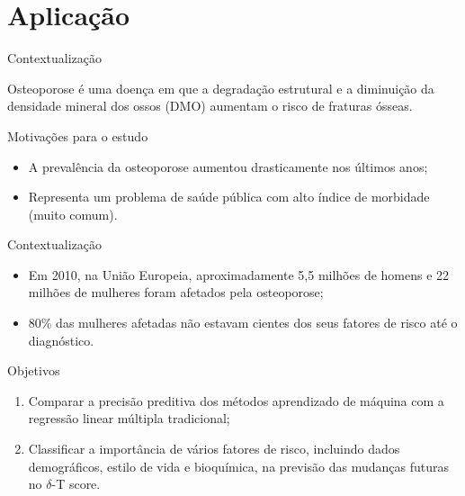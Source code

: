 \section{Aplicação}

\begin{frame}{Contextualização}
	\begin{block}{Osteoporose}
		é uma doença em que a degradação estrutural e a diminuição da densidade mineral dos ossos (DMO) aumentam o risco de fraturas ósseas.
	\end{block}
	\begin{block}{Motivações para o estudo}
		\begin{itemize}
			\item  A prevalência da osteoporose aumentou drasticamente nos últimos anos;
			\item  Representa um problema de saúde pública com alto índice de morbidade (muito comum).
		\end{itemize}
	\end{block}
\end{frame}

\begin{frame}{Contextualização}
	\begin{block}{}
		\begin{itemize}
			\item Em 2010, na União Europeia, aproximadamente 5,5 milhões de homens e 22 milhões de mulheres foram afetados pela osteoporose;
			\item 80\% das mulheres afetadas não estavam cientes dos seus fatores de risco até o diagnóstico.
		\end{itemize}
	\end{block}
\end{frame}

\begin{frame}{Objetivos}
	\begin{block}{}
			\begin{enumerate}
			\item Comparar a precisão preditiva dos métodos aprendizado de máquina com a regressão linear múltipla tradicional;
			\item Classificar a importância de vários fatores de risco, incluindo dados demográficos, estilo de vida e bioquímica, na previsão das mudanças futuras no $\delta$-T score.
		\end{enumerate}
	\end{block}
\end{frame}

